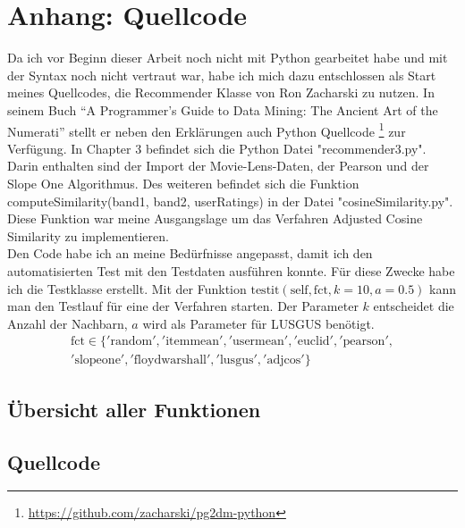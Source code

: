 \newpage
\appendix
\section{Anhang: Quellcode}

Da ich vor Beginn dieser Arbeit noch nicht mit Python gearbeitet habe und mit der Syntax noch nicht vertraut war, habe ich mich dazu entschlossen als Start meines Quellcodes, die Recommender Klasse von Ron Zacharski zu nutzen. In seinem Buch "`A Programmer's Guide to Data Mining: The Ancient Art of the Numerati"' \cite{G2DM} stellt er neben den Erklärungen auch Python Quellcode \footnote{\url{https://github.com/zacharski/pg2dm-python}} zur Verfügung. In Chapter 3 befindet sich die Python Datei "recommender3.py". Darin enthalten sind der Import der Movie-Lens-Daten, der Pearson und der Slope One Algorithmus. Des weiteren befindet sich die Funktion computeSimilarity(band1, band2, userRatings) in der Datei "cosineSimilarity.py". Diese Funktion war meine Ausgangslage um das Verfahren Adjusted Cosine Similarity zu implementieren.\\
Den Code habe ich an meine Bedürfnisse angepasst, damit ich den automatisierten Test mit den Testdaten ausführen konnte. Für diese Zwecke habe ich die Testklasse erstellt. Mit der Funktion $\mathrm{testit}(\mathrm{self}, \mathrm{fct}, k=10, a=0.5)$ kann man den Testlauf für eine der Verfahren starten. Der Parameter $k$ entscheidet die Anzahl der Nachbarn, $a$ wird als Parameter für LUSGUS benötigt. 
\begin{equation}
\begin{aligned}
\mathrm{fct} \in \{\mathrm{'random', 'itemmean', 'usermean', 'euclid', 'pearson',}\\ \mathrm{'slopeone', 'floydwarshall', 'lusgus', 'adjcos'}\}
\end{aligned}
\end{equation}

\subsection{Übersicht aller Funktionen} \label{anhang:übersicht}
\lstset{%
	breaklines=true
}


\clearpage

\subsection{Quellcode} \label{anhang:quellcode}




\clearpage